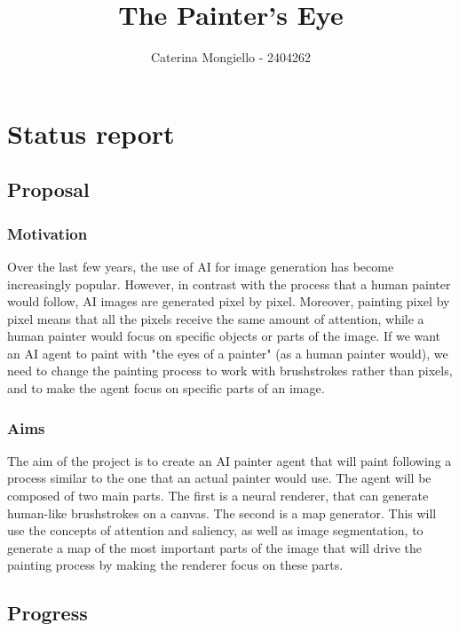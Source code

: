 \documentclass[11pt]{article}
\title{The Painter's Eye}
\author{Caterina Mongiello - 2404262}
\begin{document}
    \maketitle
    
    
     

\section{Status report}

\subsection{Proposal}\label{proposal}

\subsubsection{Motivation}\label{motivation}

Over the last few years, the use of AI for image generation has become increasingly popular. However, in contrast with the process that a human painter would follow, AI images are generated pixel by pixel. Moreover, painting pixel by pixel means that all the pixels receive the same amount of attention, while a human painter would focus on specific objects or parts of the image. If we want an AI agent to paint with "the eyes of a  painter" (as a human painter would), we need to change the painting process to work with brushstrokes rather than pixels, and to make the agent focus on specific parts of an image. 

\subsubsection{Aims}\label{aims}

The aim of the project is to create an AI painter agent that will paint following a process similar to the one that an actual painter would use. The agent will be composed of two main parts. The first is a neural renderer, that can generate human-like brushstrokes on a canvas. The second is a map generator. This will use the concepts of attention and saliency, as well as image segmentation, to generate a map of the most important parts of the image that will drive the painting process by making the renderer focus on these parts. 

\subsection{Progress}\label{progress}
\end{document}
